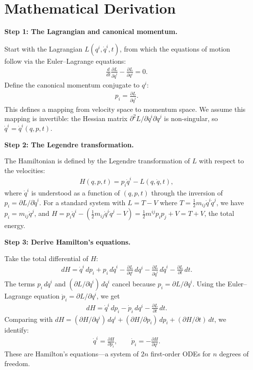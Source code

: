 \section*{Mathematical Derivation}

\textbf{Step 1: The Lagrangian and canonical momentum.}

Start with the Lagrangian $L(q^i, \dot{q}^i, t)$, from which the equations of motion follow via the Euler--Lagrange equations:
\begin{align}
\frac{d}{dt}\frac{\partial L}{\partial\dot{q}^i} - \frac{\partial L}{\partial q^i} = 0.
\end{align}
Define the canonical momentum conjugate to $q^i$:
\begin{align}
p_i = \frac{\partial L}{\partial\dot{q}^i}.
\end{align}
This defines a mapping from velocity space to momentum space. We assume this mapping is invertible: the Hessian matrix $\partial^2 L/\partial\dot{q}^i\partial\dot{q}^j$ is non-singular, so $\dot{q}^i = \dot{q}^i(q, p, t)$.

\textbf{Step 2: The Legendre transformation.}

The Hamiltonian is defined by the Legendre transformation of $L$ with respect to the velocities:
\begin{align}
H(q, p, t) = p_i\dot{q}^i - L(q, \dot{q}, t),
\end{align}
where $\dot{q}^i$ is understood as a function of $(q, p, t)$ through the inversion of $p_i = \partial L/\partial\dot{q}^i$. For a standard system with $L = T - V$ where $T = \frac{1}{2}m_{ij}\dot{q}^i\dot{q}^j$, we have $p_i = m_{ij}\dot{q}^j$, and $H = p_i\dot{q}^i - (\frac{1}{2}m_{ij}\dot{q}^i\dot{q}^j - V) = \frac{1}{2}m^{ij}p_ip_j + V = T + V$, the total energy.

\textbf{Step 3: Derive Hamilton's equations.}

Take the total differential of $H$:
\begin{align}
dH = \dot{q}^i\,dp_i + p_i\,d\dot{q}^i - \frac{\partial L}{\partial q^i}\,dq^i - \frac{\partial L}{\partial\dot{q}^i}\,d\dot{q}^i - \frac{\partial L}{\partial t}\,dt.
\end{align}
The terms $p_i\,d\dot{q}^i$ and $(\partial L/\partial\dot{q}^i)\,d\dot{q}^i$ cancel because $p_i = \partial L/\partial\dot{q}^i$. Using the Euler--Lagrange equation $\dot{p}_i = \partial L/\partial q^i$, we get
\begin{align}
dH = \dot{q}^i\,dp_i - \dot{p}_i\,dq^i - \frac{\partial L}{\partial t}\,dt.
\end{align}
Comparing with $dH = (\partial H/\partial q^i)\,dq^i + (\partial H/\partial p_i)\,dp_i + (\partial H/\partial t)\,dt$, we identify:
\begin{align}
\boxed{\dot{q}^i = \frac{\partial H}{\partial p_i}, \qquad \dot{p}_i = -\frac{\partial H}{\partial q^i}.}
\end{align}
These are Hamilton's equations---a system of $2n$ first-order ODEs for $n$ degrees of freedom.

